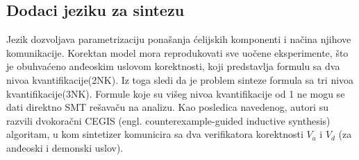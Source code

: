 \documentclass[a4paper]{article}
\begin{document}
\subsection{Dodaci jeziku za sintezu}
Jezik dozvoljava parametrizaciju ponašanja ćelijskih komponenti i načina njihove komunikacije. Korektan model mora reprodukovati sve uočene eksperimente, što je obuhvaćeno anđeoskim uslovom korektnosti, koji predstavlja formulu sa dva nivoa kvantifikacije(2NK). Iz toga sledi da je problem sinteze formula sa tri nivoa kvantifikacije(3NK). Formule koje su višeg nivoa kvantifikacije od 1 ne mogu se dati direktno SMT rešavaču na analizu. Kao posledica navedenog, autori su razvili dvokoračni CEGIS (engl. counterexample-guided inductive synthesis) algoritam, u kom sintetizer komunicira sa dva verifikatora korektnosti $V_a$ i $V_d$ (za anđeoski i demonski uslov).
\end{document}
